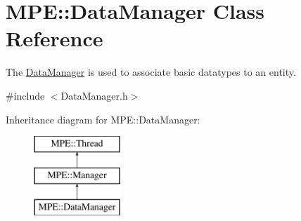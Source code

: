 \hypertarget{class_m_p_e_1_1_data_manager}{}\section{M\+PE\+:\+:Data\+Manager Class Reference}
\label{class_m_p_e_1_1_data_manager}


The \hyperlink{class_m_p_e_1_1_data_manager}{Data\+Manager} is used to associate basic datatypes to an entity.  




{\ttfamily \#include $<$Data\+Manager.\+h$>$}

Inheritance diagram for M\+PE\+:\+:Data\+Manager\+:\begin{figure}[H]
\begin{center}
\leavevmode
\includegraphics[height=3.000000cm]{class_m_p_e_1_1_data_manager}
\end{center}
\end{figure}
